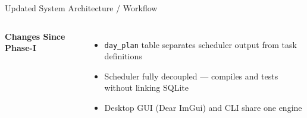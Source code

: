 \documentclass[aspectratio=169,11pt]{beamer}
\begin{document}
\begin{frame}{Updated System Architecture / Workflow}
\begin{columns}[T,totalwidth=\textwidth]
\textbf{\color{GEUBlue}Changes Since Phase-I}

\begin{itemize}\itemsep2pt
\scriptsize
\item \texttt{day\_plan} table separates scheduler output from task
      definitions
\item Scheduler fully decoupled --- compiles and tests without linking SQLite
\item Desktop GUI (Dear ImGui) and CLI share one engine
\end{itemize}

\end{columns}

\vfill


\end{frame}

\end{document}
